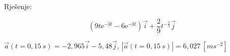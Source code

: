 

Rješenje:

$$ \left( 9t\mathrm{e}^{-3t} -6 \mathrm{e}^{-3t}    \right) \vec{i}+  \frac{2}{9} t^{-\frac{5}{3}}\vec{j}$$


 $\vec{a}(t=0,15\ s)= -2,965\vec{i}-5,48\vec{j}$, $|\vec{a}(t=0,15\ s)|= 6,027\ [ms^{-2}]$

